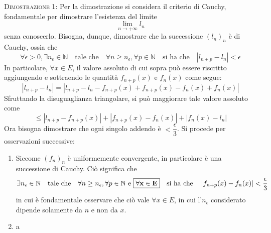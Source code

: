 \documentclass[a4paper]{extarticle}
\begin{document}
\vspace{2em}
\noindent
\normalfont \normalsize
\textsc{Dimostrazione 1}: Per la dimostrazione si considera il criterio di Cauchy, fondamentale per dimostrare l'esistenza del limite
\[\lim_{n \to +\infty} l_n\]
senza conoscerlo. Bisogna, dunque, dimostrare che la successione $(l_n)_n$ è di Cauchy, ossia che
\[\forall \epsilon > 0, \exists n_\epsilon \in \mathbb{N} \hspace{1em} \text{tale che} \hspace{1em} \forall n \geq n_\epsilon, \forall p \in \mathbb{N} \hspace{1em} \text{si ha che} \hspace{1em} \left \vert l_{n+p} - l_n \right \vert < \epsilon\]
In particolare, $\forall x \in E$, il valore assoluto di cui sopra può essere riscritto aggiungendo e sottraendo le quantità $f_{n+p}(x)$ e $f_n(x)$ come segue:
\[\left \vert l_{n+p} - l_n\right \vert = \left \vert l_{n+p} - l_n - f_{n+p}(x) + f_{n+p}(x) - f_n(x) + f_n(x)\right \vert\]
Sfruttando la disuguaglianza triangolare, si può maggiorare tale valore assoluto come
\[\leq \left \vert l_{n+p} - f_{n+p}(x)\right \vert + \left \vert f_{n+p}(x) - f_n(x) \right \vert + \left \vert f_n(x) - l_n\right \vert\]
Ora bisogna dimostrare che ogni singolo addendo è $< \dfrac{\epsilon}{3}$. Si procede per osservazioni successive:
\begin{enumerate}
    \item Siccome $(f_n)_n$ è uniformemente convergente, in particolare è una successione di Cauchy. Ciò significa che
    \[\exists n_\epsilon \in \mathbb{N} \hspace{1em} \text{tale che} \hspace{1em} \forall n \geq n_\epsilon, \forall p \in \mathbb{N} \text{ e } \boxed{\bf{\forall x \in E}} \hspace{1em} \text{si ha che} \hspace{1em} \left \vert f_{n+p}(x) - f_n(x)\right \vert < \frac{\epsilon}{3}\]
    in cui è fondamentale osservare che ciò vale $\forall x \in E$, in cui l'$n_\epsilon$ considerato dipende solamente da $n$ e non da $x$.

    \item a
\end{enumerate}
\end{document}
